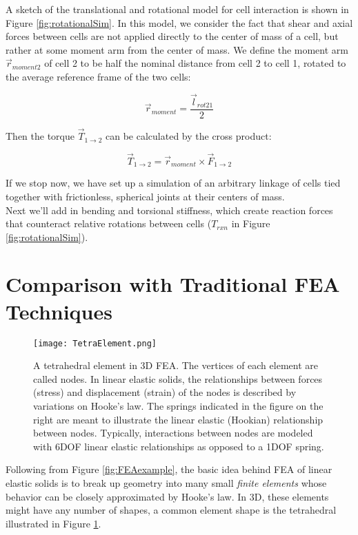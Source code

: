 {A sketch of the translational and rotational model for cell interaction is shown in Figure \ref{fig:rotationalSim}.  In this model, we consider the fact that shear and axial forces between cells are not applied directly to the center of mass of a cell, but rather at some moment arm from the center of mass.  We define the moment arm $\vec{r}_{moment2}$ of cell 2 to be half the nominal distance from cell 2 to cell 1, rotated to the average reference frame of the two cells:

\[ \vec{r}_{moment} = \dfrac{\vec{l}_{rot21}}{2}\]

Then the torque $\vec{T}_{1\rightarrow2}$ can be calculated by the cross product:

\[ \vec{T}_{1\rightarrow2} =  \vec{r}_{moment} \times \vec{F}_{1\rightarrow2}\]

If we stop now, we have set up a simulation of an arbitrary linkage of cells tied together with frictionless, spherical joints at their centers of mass.\\

Next we'll add in bending and torsional stiffness, which create reaction forces that counteract relative rotations between cells ($T_{rxn}$ in Figure \ref{fig:rotationalSim}).  \\

\section{Comparison with Traditional FEA Techniques}

\begin{figure}
  \texttt{[image: TetraElement.png]}
  \caption{A tetrahedral element in 3D FEA.  The vertices of each element are called nodes.  In linear elastic solids, the relationships between forces (stress) and displacement (strain) of the nodes is described by variations on Hooke's law.  The springs indicated in the figure on the right are meant to illustrate the linear elastic (Hookian) relationship between nodes.  Typically, interactions between nodes are modeled with 6DOF linear elastic relationships as opposed to a 1DOF spring.}
  \label{fig:TetraElement}
\end{figure}

Following from Figure \ref{fig:FEAexample}, the basic idea behind FEA of linear elastic solids is to break up geometry into many small \textit{finite elements} whose behavior can be closely approximated by Hooke's law.  In 3D, these elements might have any number of shapes, a common element shape is the tetrahedral illustrated in Figure \ref{fig:TetraElement}.\\

}
